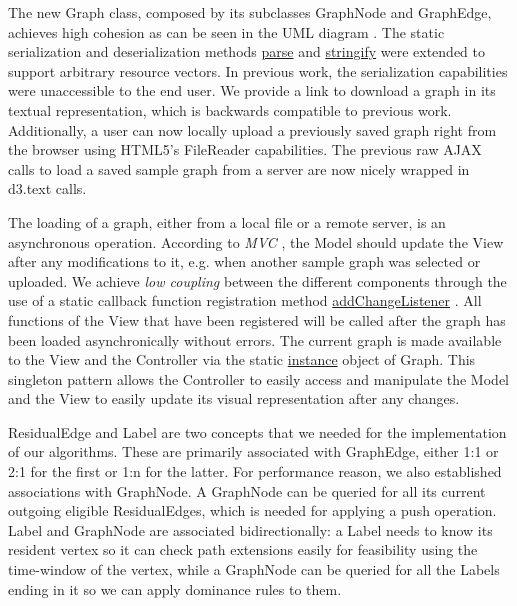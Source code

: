 The new Graph class, composed by its subclasses GraphNode and GraphEdge, achieves high cohesion as can be seen in the UML diagram . The static serialization and deserialization methods \underline{parse} and \underline{stringify} were extended to support arbitrary resource vectors. In previous work, the serialization capabilities were unaccessible to the end user. We provide a link to download a graph in its textual representation, which is backwards compatible to previous work. Additionally, a user can now locally upload a previously saved graph right from the browser using HTML5's FileReader  capabilities. The previous raw AJAX  calls to load a saved sample graph from a server are now nicely wrapped in d3.text calls.

The loading of a graph, either from a local file or a remote server, is an asynchronous operation. According to \textit{MVC} , the Model should update the View  after any modifications to it, e.g. when another sample graph was selected or uploaded. We achieve \textit{low coupling}  between the different components through the use of a static callback function registration method \underline{addChangeListener} . All functions of the View that have been registered will be called after the graph has been loaded asynchronically without errors. The current graph is made available to the View and the Controller  via the static \underline{instance} object of Graph. This singleton pattern allows the Controller to easily access and manipulate the Model and the View to easily update its visual representation after any changes.  %

ResidualEdge and Label are two concepts that we needed for the implementation of our algorithms. These are primarily associated with GraphEdge, either 1:1 or 2:1 for the first or 1:n for the latter. For performance reason, we also established associations with GraphNode. A GraphNode can be queried for all its current outgoing eligible ResidualEdges, which is needed for applying a push operation. Label and GraphNode are associated bidirectionally: a Label needs to know its resident vertex so it can check path extensions easily for feasibility using the time-window of the vertex, while a GraphNode can be queried for all the Labels ending in it so we can apply dominance rules to them.




